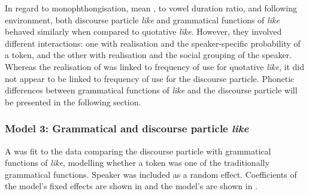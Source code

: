 


In regard to monophthongisation, mean ,  to vowel duration ratio, and following environment, both discourse particle \textit{like} and grammatical functions of \textit{like} behaved similarly when compared to quotative \textit{like}. However, they involved different interactions: one with  realisation and the speaker-specific probability of a token, and the other with  realisation and the social grouping of the speaker. Whereas the realisation of  was linked to frequency of use for quotative \textit{like}, it did not appear to be linked to frequency of use for the discourse particle. Phonetic differences between grammatical functions of \textit{like} and the discourse particle will be presented in the following section.





\subsubsection{Model 3: Grammatical and discourse particle \textit{like}}


A  was fit to the data comparing the discourse particle with grammatical functions of \textit{like}, modelling whether a token was one of the traditionally grammatical functions. Speaker was included as a random effect. Coefficients of the model's fixed effects are shown in  and the model's  are shown in . 


